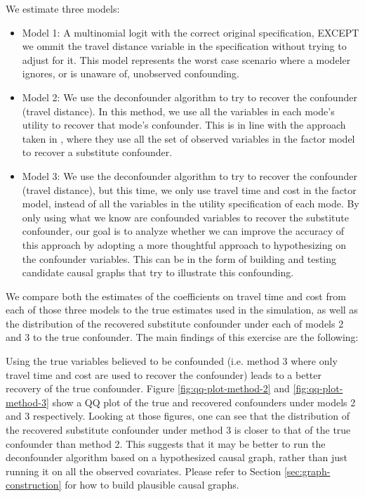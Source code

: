 We estimate three models:

\begin{itemize}
	\item Model 1: A multinomial logit with the correct original specification, 
	EXCEPT we ommit the travel distance variable in the specification without 
	trying to adjust for it. This model represents the worst case scenario 
	where a modeler ignores, or is unaware of, unobserved confounding.
	\item Model 2: We use the deconfounder algorithm to try to recover the 
	confounder (travel distance). In this method, we use all the variables in 
	each mode's utility to recover that mode's confounder. This is in line 
	with the approach taken in \citet{wang_2019_blessings}, where they use all the set 
	of observed variables in the factor model to recover a substitute 
	confounder.
	\item Model 3: We use the deconfounder algorithm to try to recover the 
	confounder (travel distance), but this time, we only use travel time and 
	cost in the factor model, instead of all the variables in the utility 
	specification of each mode. By only using what we know are confounded 
	variables to recover the substitute confounder, our goal is to analyze 
	whether we can improve the accuracy of this approach by adopting a more 
	thoughtful approach to hypothesizing on the confounder variables. This can 
	be in the form of building and testing candidate causal graphs that 
	try to illustrate this confounding. 
\end{itemize}


We compare both the estimates of the coefficients on travel time and cost from 
each of those three models to the true estimates used in the simulation, as well as the distribution of the recovered substitute confounder under each of 
models 2 and 3 to the true confounder. The main findings of this exercise are the following:


Using the true variables believed to be confounded (i.e. method 3 where only 
travel time and cost are used to recover the confounder) leads to a better 
recovery of the true confounder. Figure \ref{fig:qq-plot-method-2} and \ref{fig:qq-plot-method-3} show a QQ plot of the true 
and recovered confounders under models 2 and 3 respectively. Looking at those 
figures, one can see that the distribution of the recovered substitute 
confounder under method 3 is closer to that of the true confounder than method 
2. This suggests that it may be better to run the deconfounder algorithm based 
on a hypothesized causal graph, rather than just running it on all the 
observed covariates. Please refer to Section \ref{sec:graph-construction} for how to build plausible causal graphs. 


